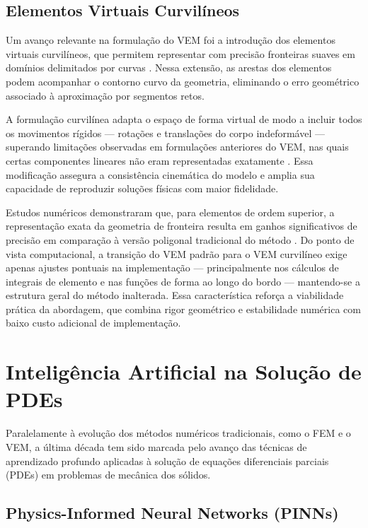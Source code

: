 \documentclass[12pt,openright,oneside,a4paper,english,brazil]{abntex2}
\begin{document}
\subsection{Elementos Virtuais Curvilíneos}

Um avanço relevante na formulação do VEM foi a introdução dos elementos virtuais curvilíneos, que permitem representar com precisão fronteiras suaves em domínios delimitados por curvas \cite{artioli2021}. Nessa extensão, as arestas dos elementos podem acompanhar o contorno curvo da geometria, eliminando o erro geométrico associado à aproximação por segmentos retos.

A formulação curvilínea adapta o espaço de forma virtual de modo a incluir todos os movimentos rígidos — rotações e translações do corpo indeformável — superando limitações observadas em formulações anteriores do VEM, nas quais certas componentes lineares não eram representadas exatamente \cite{artioli2021}. Essa modificação assegura a consistência cinemática do modelo e amplia sua capacidade 
de reproduzir soluções físicas com maior fidelidade.

Estudos numéricos demonstraram que, para elementos de ordem superior, a representação exata da geometria de fronteira resulta em ganhos significativos de precisão em comparação à versão poligonal tradicional do método \cite{artioli2021}. Do ponto de vista computacional, a transição do VEM padrão para o VEM curvilíneo exige apenas ajustes pontuais na implementação — principalmente nos 
cálculos de integrais de elemento e nas funções de forma ao longo do bordo — mantendo-se a estrutura geral do método inalterada. Essa característica reforça a viabilidade prática da abordagem, que combina rigor geométrico e estabilidade numérica com baixo custo adicional de implementação.

\section{Inteligência Artificial na Solução de PDEs}

Paralelamente à evolução dos métodos numéricos tradicionais, como o FEM e o VEM, a última década tem sido marcada pelo avanço das técnicas de aprendizado profundo aplicadas à solução de equações diferenciais parciais (PDEs) em problemas de mecânica dos sólidos.

\subsection{Physics-Informed Neural Networks (PINNs)}
\end{document}
